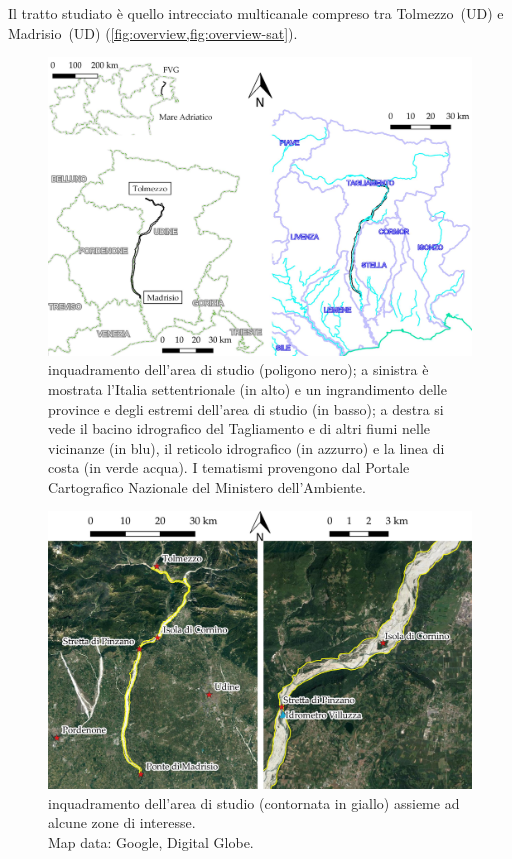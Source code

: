 Il tratto studiato è quello intrecciato multicanale compreso tra Tolmezzo~(UD) e Madrisio~(UD) (\cref{fig:overview,fig:overview-sat}). 
%
\begin{figure}
	\centering
	\includegraphics[width=\textwidth]{files/overview.jpeg}
	\caption[inquadramento dell'area di studio]
		{inquadramento dell'area di studio (poligono nero); a sinistra è mostrata l'Italia settentrionale (in alto) e un ingrandimento delle province e degli estremi dell'area di studio (in basso); a destra si vede il bacino idrografico del Tagliamento e di altri fiumi nelle vicinanze (in blu), il reticolo idrografico (in azzurro) e la linea di costa (in verde acqua). I tematismi provengono dal Portale Cartografico Nazionale del Ministero dell'Ambiente.}
	\label{fig:overview}
\end{figure}
%
\begin{figure}
	\centering
	\includegraphics[width=\textwidth]{files/overview_tratto_sat.jpeg}
	\caption[inquadramento dell'area di studio]{inquadramento dell'area di studio (contornata in giallo) assieme ad alcune zone di interesse.
	\\
	Map data: Google, Digital Globe.}
	\label{fig:overview-sat}
\end{figure}
